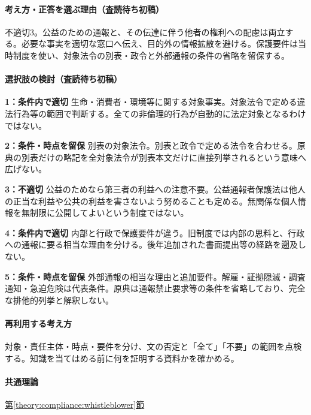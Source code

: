 \paragraph{考え方・正答を選ぶ理由（査読待ち初稿）} 不適切3。公益のための通報と、その伝達に伴う他者の権利への配慮は両立する。必要な事実を適切な窓口へ伝え、目的外の情報拡散を避ける。保護要件は当時制度を使い、対象法令の別表・政令と外部通報の条件の省略を留保する。

\paragraph{選択肢の検討（査読待ち初稿）}\mbox{}\par

\noindent\textbf{1：条件内で適切} 生命・消費者・環境等に関する対象事実。対象法令で定める違法行為等の範囲で判断する。全ての非倫理的行為が自動的に法定対象となるわけではない。\par

\noindent\textbf{2：条件・時点を留保} 別表の対象法令。別表と政令で定める法令を合わせる。原典の別表だけの略記を全対象法令が別表本文だけに直接列挙されるという意味へ広げない。\par

\noindent\textbf{3：不適切} 公益のためなら第三者の利益への注意不要。公益通報者保護法は他人の正当な利益や公共の利益を害さないよう努めることも定める。無関係な個人情報を無制限に公開してよいという制度ではない。\par

\noindent\textbf{4：条件内で適切} 内部と行政で保護要件が違う。旧制度では内部の思料と、行政への通報に要る相当な理由を分ける。後年追加された書面提出等の経路を遡及しない。\par

\noindent\textbf{5：条件・時点を留保} 外部通報の相当な理由と追加要件。解雇・証拠隠滅・調査通知・急迫危険は代表条件。原典は通報禁止要求等の条件を省略しており、完全な排他的列挙と解釈しない。\par

\paragraph{再利用する考え方} 対象・責任主体・時点・要件を分け、文の否定と「全て」「不要」の範囲を点検する。知識を当てはめる前に何を証明する資料かを確かめる。

\paragraph{共通理論} \hyperref[theory:compliance:whistleblower]{第\ref*{theory:compliance:whistleblower}節}


